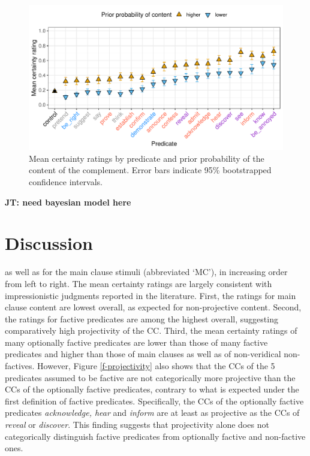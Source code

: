 \documentclass[11pt,fleqn]{article}
\newcommand{\6}{\mbox{$[\hspace*{-.6mm}[$}}
\newcommand{\9}{\mbox{$]\hspace*{-.6mm}]$}}
\newcommand{\jt}[1]{\textbf{\color{blue}JT: #1}}
\begin{document}
\begin{figure}[H]
\centering

\includegraphics[width=.75\paperwidth]{../../results/3-projectivity/graphs/means-projectivity-by-predicate-and-facttype}

\caption{Mean certainty ratings by predicate and prior probability of the content of the complement. Error bars indicate 95\% bootstrapped confidence intervals.} 
\label{f-projection}
\end{figure}

\jt{need bayesian model here}

\section{Discussion}\label{s4}


as well as for the main clause stimuli (abbreviated `MC'), in increasing order from left to right. The mean certainty ratings are largely consistent with impressionistic judgments reported in the literature. First, the ratings for main clause content are lowest overall, as expected for non-projective content. Second, the ratings for factive predicates are among the highest overall, suggesting comparatively high projectivity of the CC. Third, the mean certainty ratings of many optionally factive predicates are lower than those of many factive predicates and higher than those of main clauses as well as of non-veridical non-factives. However, Figure \ref{f-projectivity} also shows that the CCs of the 5 predicates assumed to be factive are not categorically more projective than the CCs of the optionally factive predicates, contrary to what is expected under the first definition of factive predicates. Specifically, the CCs of the optionally factive predicates {\em acknowledge, hear} and {\em inform} are at least as projective as the CCs of {\em reveal} or {\em discover}. This finding suggests that projectivity alone does not categorically distinguish factive predicates from optionally factive and non-factive ones.
\end{document}
